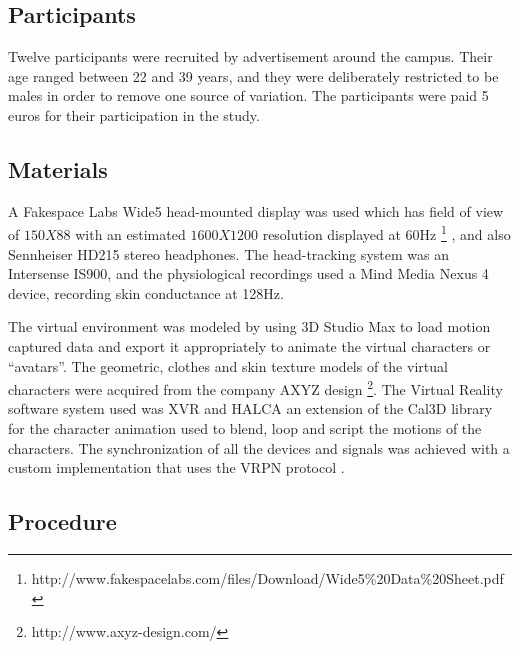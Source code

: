 \documentclass[
		twoside,openright,titlepage,numbers=noenddot,manychapters,
		headinclude,%
                footinclude=false,cleardoublepage=empty,
                BCOR=5mm,
		fontsize=11pt, %
                 enabledeprecatedfontcommands]{scrreprt}
\begin{document}
\subsection{Participants}

Twelve participants were recruited by advertisement around the campus. Their age ranged between 22 and 39 years, and they were deliberately restricted to be males in order to remove one source of variation. The participants were paid 5 euros for their participation in the study.

\subsection{Materials}
A Fakespace Labs Wide5 head-mounted display was used which has field of view of $150 X  88$ with an estimated $ 1600 X  1200$ resolution displayed at 60Hz \footnote{ http://www.fakespacelabs.com/files/Download/Wide5\%20Data\%20Sheet.pdf } , and also Sennheiser HD215 stereo headphones. The head-tracking system was an Intersense IS900, and the physiological recordings used a Mind Media Nexus 4 device, recording skin conductance at 128Hz.

The virtual environment was modeled by using 3D Studio Max to load motion captured data and export it appropriately to animate the virtual characters or ``avatars''. The geometric, clothes and skin texture models of the virtual characters were acquired from the company AXYZ design \footnote{http://www.axyz-design.com/}. The Virtual Reality software system used was XVR \cite[]{carrozzino2005lowering} and HALCA \cite[]{Spanlang_HALCA_2009} an extension of the Cal3D library for the character animation used to blend, loop and script the motions of the characters.  The synchronization of all the devices and signals was achieved with a custom implementation that uses the VRPN protocol \cite{hudson2001vrpn}.

\subsection{Procedure}
\end{document}
